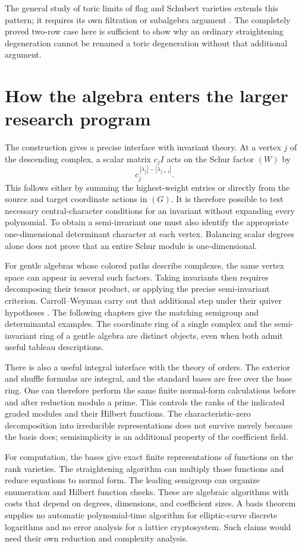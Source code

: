 The general study
of toric limits
of flag and
Schubert varieties
extends this
pattern; it
requires its
own filtration
or subalgebra
argument
\cite{smtGL1997}.
The completely
proved two-row
case here is
sufficient to
show why an
ordinary
straightening
degeneration
cannot be
renamed a
toric degeneration
without that
additional
argument.

\section{How the algebra enters the larger research program}

The construction gives
a precise interface
with invariant theory.
At a vertex \(j\)
of the descending
complex, a scalar
matrix \(c_jI\)
acts on the
Schur factor
\((W)\) by
\[
 c_j^{\,|\lambda_j|-|\lambda_{j+1}|}.
 \]
This follows
either by summing
the highest-weight
entries or
directly from
the source and
target coordinate
actions in
\((G)\).
It is therefore
possible to
test necessary
central-character
conditions for
an invariant
without expanding
every polynomial.
To obtain a
semi-invariant
one must also
identify the
appropriate
one-dimensional
determinant
character at
each vertex.
Balancing scalar
degrees alone
does not prove
that an entire
Schur module is
one-dimensional.

For gentle algebras
whose colored
paths describe
complexes, the
same vertex
space can appear
in several such
factors.  Taking
invariants then
requires decomposing
their tensor
product, or
applying the
precise
semi-invariant
criterion.
Carroll--Weyman
carry out that
additional step
under their
quiver hypotheses
\cite{smtCW2011}.
The following
chapters give
the matching
semigroup and
determinantal
examples.  The
coordinate ring
of a single
complex and
the semi-invariant
ring of a
gentle algebra
are distinct
objects, even
when both
admit useful
tableau
descriptions.

There is also a
useful integral
interface with
the theory of
orders.  The
exterior and
shuffle formulas
are integral,
and the standard
bases are free
over the base
ring.  One can
therefore perform
the same finite
normal-form
calculations
before and
after reduction
modulo a prime.
This controls
the ranks of
the indicated
graded modules
and their
Hilbert
functions.
The
characteristic-zero
decomposition
into irreducible
representations
does not survive
merely because
the basis does;
semisimplicity
is an additional
property of
the coefficient
field.

For computation,
the bases give
exact finite
representations
of functions
on the rank
varieties.
The straightening
algorithm can
multiply those
functions and
reduce equations
to normal form.
The leading
semigroup can
organize enumeration
and Hilbert
function checks.
These are
algebraic
algorithms with
costs that depend
on degrees,
dimensions, and
coefficient
sizes.  A basis
theorem supplies
no automatic
polynomial-time
algorithm for
elliptic-curve
discrete
logarithms and
no error
analysis for
a lattice
cryptosystem.
Such claims
would need
their own
reduction and
complexity
analysis.

